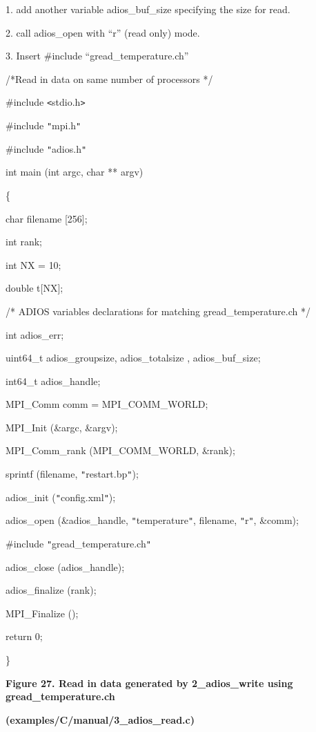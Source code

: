 1. add another variable adios\_buf\_size specifying the size for read.

2. call adios\_open with ``r'' (read only) mode.

3. Insert \#include ``gread\_temperature.ch''

/*Read in data on same number of processors */

\#include \texttt{<}stdio.h\texttt{>}

\#include \texttt{"}mpi.h\texttt{"}

\#include \texttt{"}adios.h\texttt{"}

int main (int argc, char ** argv) 

\{

\leftskip=18pt
char      \textbf{    } filename [256];

int              rank;

int              NX\textbf{ }=\textbf{ }10;

double      t[NX];

/* ADIOS variables declarations for matching gread\_temperature.ch */

int                  adios\_err;

uint64\_t       adios\_groupsize, adios\_totalsize{\color{color02} , adios\_buf\_size};

int64\_t          adios\_handle;

MPI\_Comm  comm =  MPI\_COMM\_WORLD;

MPI\_Init (\&argc, \&argv);

MPI\_Comm\_rank (MPI\_COMM\_WORLD, \&rank);

sprintf (filename, \texttt{"}restart.bp\texttt{"});

adios\_init (\texttt{"}config.xml\texttt{"});

adios\_open (\&adios\_handle, \texttt{"}temperature\texttt{"}, filename, {\color{color02} \texttt{"}r\texttt{"}}, 
\&comm);

{\color{color02} \#include \texttt{"}gread\_temperature.ch\texttt{"}}

adios\_close (adios\_handle);

adios\_finalize (rank);

MPI\_Finalize ();

return 0;

\leftskip=0pt
\}

\label{HRef119580520}\label{HToc144350186}

\begin{center}
{\color{color20} \textbf{Figure 27. Read in data generated by 2\_adios\_write using 
gread\_temperature.ch}}

{\color{color20} \textbf{(examples/C/manual/3\_adios\_read.c)}}
\end{center}

